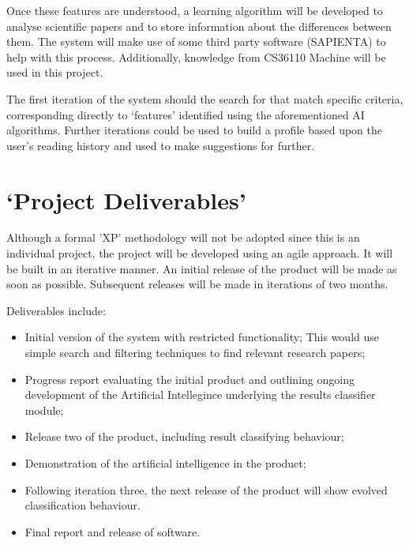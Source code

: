 \documentclass[12pt,a4paper]{article}
\begin{document}
Once these features are understood, a learning algorithm will be developed to
analyse scientific papers and to store information about the differences between 
them. The system will make use of some third party software (SAPIENTA) to help
with this process. Additionally, knowledge from CS36110 Machine will be used in
this project.

The first iteration of the system should the search for  that match specific criteria,
corresponding directly to `features' identified using the aforementioned AI
algorithms. Further iterations could be used  to build a profile based upon the user's 
reading history and used to make suggestions for further.

\section{`Project Deliverables'}

Although a formal 'XP' methodology will not be adopted since this is an
individual project, the project will be developed using an agile approach. It will be built in an
iterative manner. An initial release of the product will be made as soon as
possible. Subsequent releases will be made in iterations of two months.

Deliverables include:
\begin{itemize}
    \item Initial version of the system with restricted functionality; This
    would  use simple search and filtering techniques to find relevant research
    papers;
    \item Progress report evaluating the initial product and outlining ongoing
    development of the Artificial Intellegince underlying the results
    classifier module;
    \item Release two of the product, including result classifying behaviour;
    \item Demonstration of the artificial intelligence in the product;
    \item Following iteration three, the next release of the product will show
    evolved classification behaviour.
    \item Final report and release of software.
\end{itemize}


\renewcommand{\refname}{Initial Bibliography} 

\nocite{*}

\end{document}

